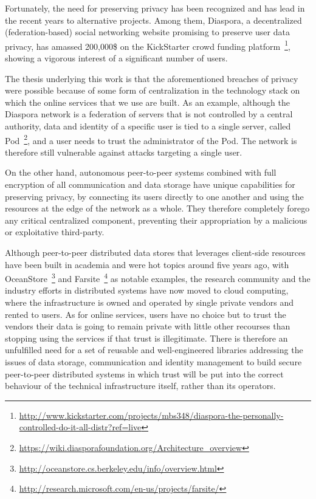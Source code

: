 Fortunately, the need for preserving privacy has been recognized and has lead in the recent years to alternative projects. Among them, Diaspora, a decentralized (federation-based) social networking website promising to preserve user data privacy, has amassed 200,000\$ on the KickStarter crowd funding platform~\footnote{\url{http://www.kickstarter.com/projects/mbs348/diaspora-the-personally-controlled-do-it-all-distr?ref=live}}, showing a vigorous interest of a significant number of users. 

The thesis underlying this work is that the aforementioned breaches of privacy were possible because of some form of centralization in the technology stack on which the online services that we use are built. As an example, although the Diaspora network is a federation of servers that is not controlled by a central authority, data and identity of a specific user is tied to a single server, called Pod~\footnote{\url{https://wiki.diasporafoundation.org/Architecture_overview}}, and a user needs to trust the administrator of the Pod. The network is therefore still vulnerable against attacks targeting a single user.

On the other hand, autonomous peer-to-peer systems combined with full encryption of all communication and data storage have unique capabilities for preserving privacy, by connecting its users directly to one another and using the resources at the edge of the network as a whole. They therefore completely forego any critical centralized component, preventing their appropriation by a malicious or exploitative third-party.

Although peer-to-peer distributed data stores that leverages client-side resources have been built in academia and were hot topics around five years ago, with OceanStore~\footnote{\url{http://oceanstore.cs.berkeley.edu/info/overview.html}} and Farsite~\footnote{\url{http://research.microsoft.com/en-us/projects/farsite/}} as notable examples, the research community and the industry efforts in distributed systems have now moved to cloud computing, where the infrastructure is owned and operated by single private vendors and rented to users. As for online services, users have no choice but to trust the vendors their data is going to remain private with little other recourses than stopping using the services if that trust is illegitimate. There is therefore an unfulfilled need for a set of reusable and well-engineered libraries addressing the issues of data storage, communication and identity management to build secure peer-to-peer distributed systems in which trust will be put into the correct behaviour of the technical infrastructure itself, rather than its operators.

